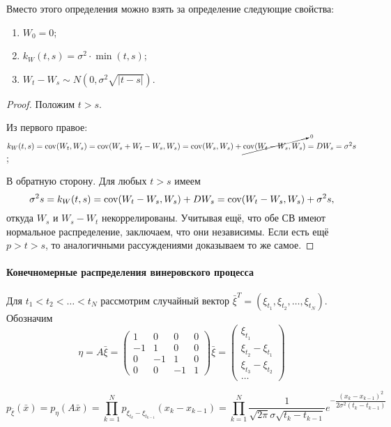\begin{utv}
  Вместо этого определения можно взять за определение следующие свойства:
  \begin{enumerate}
    \item $W_0 = 0$;
    \item $k_W(t, s) = \sigma^2 \cdot \min(t, s)$;
    \item $W_t - W_s \sim N(0, \sigma^2 \sqrt{|t-s|})$.
  \end{enumerate}
\end{utv}
\begin{proof} Положим $ t > s $.

  Из первого правое:
  $k_W(t,s) = \operatorname{cov}(W_t, W_s) = \operatorname{cov}(W_s + W_t - W_s, W_s) = \operatorname{cov}(W_s, W_s) + \cancelto{0}{\operatorname{cov}(W_t - W_s, W_s)}
  = DW_s = \sigma^2 s$;

  В обратную сторону. Для любых $ t > s $ имеем
  \[
    \sigma^2 s = k_W(t, s) = \operatorname{cov}(W_t - W_s, W_s) + DW_s = \operatorname{cov}(W_t
    - W_s, W_s) + \sigma^2 s,
  \]
  откуда $ W_s $ и $ W_s - W_t $ некоррелированы. Учитывая ещё, что обе СВ имеют
  нормальное распределение, заключаем, что они независимы. Если есть ещё $ p > t
  > s$, то аналогичными рассуждениями доказываем то же самое.
\end{proof}

\paragraph{Конечномерные распределения винеровского процесса}
Для $t_1 < t_2 < \dots < t_N$ рассмотрим случайный вектор $\bar{\xi}^T = (\xi_{t_1}, \xi_{t_2}, \dots, \xi_{t_N})$. Обозначим
\[
  \eta = A\bar{\xi} = \begin{pmatrix}
    1 & 0 & 0 & 0 \\
    -1 & 1 & 0 & 0 \\
    0 & -1 & 1 & 0 \\
    0 & 0 & -1 & 1
    \end{pmatrix} \bar{\xi} = \begin{pmatrix}
    \xi_{t_1} \\
    \xi_{t_2} - \xi_{t_1} \\
    \xi_{t_3} - \xi_{t_2} \\
    \dots
  \end{pmatrix}
\]

\[
  p_{\bar{\xi}}(\bar{x}) = p_{\eta} (A\bar{x}) = \prod_{k=1}^{N} p_{\xi_{t_k} - \xi_{t_{k-1}}} (x_k - x_{k-1})
  = \prod_{k=1}^{N} \dfrac{1}{\sqrt{2\pi} \sigma \sqrt{t_k - t_{k-1}}} e^{- \dfrac{(x_k - x_{k-1})^2}{2\sigma^2 (t_k - t_{k-1})}}
\]

